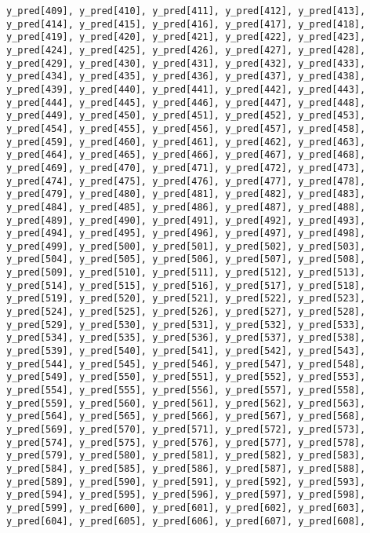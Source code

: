 \documentclass[
  letterpaper,
  DIV=11,
  numbers=noendperiod]{scrartcl}
\begin{document}
\begin{verbatim}
y_pred[409], y_pred[410], y_pred[411], y_pred[412], y_pred[413],
y_pred[414], y_pred[415], y_pred[416], y_pred[417], y_pred[418],
y_pred[419], y_pred[420], y_pred[421], y_pred[422], y_pred[423],
y_pred[424], y_pred[425], y_pred[426], y_pred[427], y_pred[428],
y_pred[429], y_pred[430], y_pred[431], y_pred[432], y_pred[433],
y_pred[434], y_pred[435], y_pred[436], y_pred[437], y_pred[438],
y_pred[439], y_pred[440], y_pred[441], y_pred[442], y_pred[443],
y_pred[444], y_pred[445], y_pred[446], y_pred[447], y_pred[448],
y_pred[449], y_pred[450], y_pred[451], y_pred[452], y_pred[453],
y_pred[454], y_pred[455], y_pred[456], y_pred[457], y_pred[458],
y_pred[459], y_pred[460], y_pred[461], y_pred[462], y_pred[463],
y_pred[464], y_pred[465], y_pred[466], y_pred[467], y_pred[468],
y_pred[469], y_pred[470], y_pred[471], y_pred[472], y_pred[473],
y_pred[474], y_pred[475], y_pred[476], y_pred[477], y_pred[478],
y_pred[479], y_pred[480], y_pred[481], y_pred[482], y_pred[483],
y_pred[484], y_pred[485], y_pred[486], y_pred[487], y_pred[488],
y_pred[489], y_pred[490], y_pred[491], y_pred[492], y_pred[493],
y_pred[494], y_pred[495], y_pred[496], y_pred[497], y_pred[498],
y_pred[499], y_pred[500], y_pred[501], y_pred[502], y_pred[503],
y_pred[504], y_pred[505], y_pred[506], y_pred[507], y_pred[508],
y_pred[509], y_pred[510], y_pred[511], y_pred[512], y_pred[513],
y_pred[514], y_pred[515], y_pred[516], y_pred[517], y_pred[518],
y_pred[519], y_pred[520], y_pred[521], y_pred[522], y_pred[523],
y_pred[524], y_pred[525], y_pred[526], y_pred[527], y_pred[528],
y_pred[529], y_pred[530], y_pred[531], y_pred[532], y_pred[533],
y_pred[534], y_pred[535], y_pred[536], y_pred[537], y_pred[538],
y_pred[539], y_pred[540], y_pred[541], y_pred[542], y_pred[543],
y_pred[544], y_pred[545], y_pred[546], y_pred[547], y_pred[548],
y_pred[549], y_pred[550], y_pred[551], y_pred[552], y_pred[553],
y_pred[554], y_pred[555], y_pred[556], y_pred[557], y_pred[558],
y_pred[559], y_pred[560], y_pred[561], y_pred[562], y_pred[563],
y_pred[564], y_pred[565], y_pred[566], y_pred[567], y_pred[568],
y_pred[569], y_pred[570], y_pred[571], y_pred[572], y_pred[573],
y_pred[574], y_pred[575], y_pred[576], y_pred[577], y_pred[578],
y_pred[579], y_pred[580], y_pred[581], y_pred[582], y_pred[583],
y_pred[584], y_pred[585], y_pred[586], y_pred[587], y_pred[588],
y_pred[589], y_pred[590], y_pred[591], y_pred[592], y_pred[593],
y_pred[594], y_pred[595], y_pred[596], y_pred[597], y_pred[598],
y_pred[599], y_pred[600], y_pred[601], y_pred[602], y_pred[603],
y_pred[604], y_pred[605], y_pred[606], y_pred[607], y_pred[608],

\end{verbatim}
\end{document}
